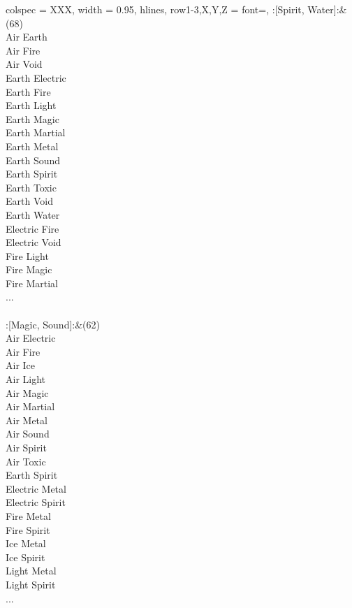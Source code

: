 \begin{longtblr}[
	caption = {2v2 Attacking Effective},
	label = {2v2-Attacking-Effective},
]{
	colspec = {XXX}, width = 0.95\linewidth,
	hlines,
	row{1-3,X,Y,Z} = {font=\bfseries},
}
	:[Spirit, Water]:&{(68)\\
	Air Earth \\
	Air Fire \\
	Air Void \\
	Earth Electric \\
	Earth Fire \\
	Earth Light \\
	Earth Magic \\
	Earth Martial \\
	Earth Metal \\
	Earth Sound \\
	Earth Spirit \\
	Earth Toxic \\
	Earth Void \\
	Earth Water \\
	Electric Fire \\
	Electric Void \\
	Fire Light \\
	Fire Magic \\
	Fire Martial \\
	...\\
	}\\

	:[Magic, Sound]:&{(62)\\
	Air Electric \\
	Air Fire \\
	Air Ice \\
	Air Light \\
	Air Magic \\
	Air Martial \\
	Air Metal \\
	Air Sound \\
	Air Spirit \\
	Air Toxic \\
	Earth Spirit \\
	Electric Metal \\
	Electric Spirit \\
	Fire Metal \\
	Fire Spirit \\
	Ice Metal \\
	Ice Spirit \\
	Light Metal \\
	Light Spirit \\
	...\\
	}\\


\end{longtblr}
